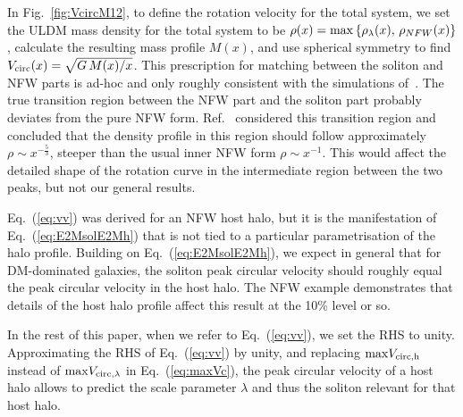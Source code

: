 \documentclass[aps,prd,floats,superscriptaddress,showpacs,nofootinbib,twocolumn,preprintnumbers]{revtex4-1}%
\begin{document}
In Fig.~\ref{fig:VcircM12}, to define the rotation velocity for the total system, we set the ULDM mass density for the total system to be $\rho(x)={\rm max}\left\{\rho_\lambda(x),\,\rho_{NFW}(x)\right\}$, calculate the resulting mass profile $M(x)$, and use spherical symmetry to find $V_{\rm circ}(x)=\sqrt{G\,M(x)/x}$. This prescription for matching between the soliton and NFW parts is ad-hoc and only roughly consistent with the simulations of~\cite{Schive:2014hza,Schive:2014dra}. The true transition region between the NFW part and the soliton part probably deviates from the pure NFW form. Ref.~\cite{Vicens:2018kdk} considered this transition region and concluded that the density profile in this region should follow approximately $\rho\sim x^{-\frac{5}{3}}$, steeper than the usual inner NFW form $\rho\sim x^{-1}$. This would affect the detailed shape of the rotation curve in the intermediate region between the two peaks, but not our general results.

Eq.~(\ref{eq:vv}) was derived for an NFW host halo, but it is the manifestation of  Eq.~(\ref{eq:E2MsolE2Mh}) that is not tied to a particular parametrisation of the halo profile. Building on Eq.~(\ref{eq:E2MsolE2Mh}), we expect in general that for DM-dominated galaxies, the soliton peak circular velocity should roughly equal the peak circular velocity in the host halo. The NFW example demonstrates that details of the host halo profile affect this result at the 10\% level or so. 

In the rest of this paper, when we refer to Eq.~(\ref{eq:vv}), we set the RHS to unity.  
Approximating the RHS of Eq.~(\ref{eq:vv}) by unity, and replacing ${\max}V_{\rm circ,h}$ instead of ${\max}V_{\rm circ,\lambda}$ in Eq.~(\ref{eq:maxVc}), the peak circular velocity of a host halo allows to  predict the scale parameter $\lambda$ and thus the soliton relevant for that host halo.
\end{document}
